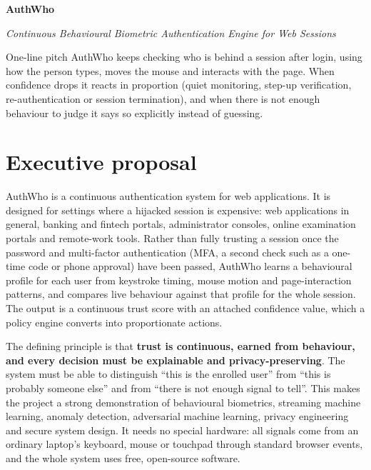 \documentclass[10pt,letterpaper]{article}
\begin{document}
{\color{navy}\bfseries\fontsize{29}{34}\selectfont AuthWho\par}
\vspace{2pt}
{\color{slate}\itshape\fontsize{13}{16}\selectfont Continuous Behavioural Biometric Authentication Engine for Web Sessions\par}
\vspace{4pt}

\begin{callout}{One-line pitch}
AuthWho keeps checking who is behind a session after login, using how the person types, moves the mouse and interacts with the page. When confidence drops it reacts in proportion (quiet monitoring, step-up verification, re-authentication or session termination), and when there is not enough behaviour to judge it says so explicitly instead of guessing.
\end{callout}

\section{Executive proposal}

AuthWho is a continuous authentication system for web applications. It is designed for settings where a hijacked session is expensive: web applications in general, banking and fintech portals, administrator consoles, online examination portals and remote-work tools. Rather than fully trusting a session once the password and multi-factor authentication (MFA, a second check such as a one-time code or phone approval) have been passed, AuthWho learns a behavioural profile for each user from keystroke timing, mouse motion and page-interaction patterns, and compares live behaviour against that profile for the whole session. The output is a continuous trust score with an attached confidence value, which a policy engine converts into proportionate actions.

The defining principle is that \textbf{trust is continuous, earned from behaviour, and every decision must be explainable and privacy-preserving}. The system must be able to distinguish ``this is the enrolled user'' from ``this is probably someone else'' and from ``there is not enough signal to tell''. This makes the project a strong demonstration of behavioural biometrics, streaming machine learning, anomaly detection, adversarial machine learning, privacy engineering and secure system design. It needs no special hardware: all signals come from an ordinary laptop's keyboard, mouse or touchpad through standard browser events, and the whole system uses free, open-source software.
\end{document}
